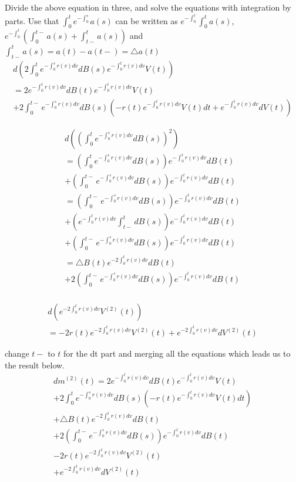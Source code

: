 \documentclass[12pt]{article}
\begin{document}
Divide the above equation in three, and solve the equations with integration by parts. Use that $\int_0^t e^{-\int_0^s} a(s)$ can be written as $e^{-\int_0^t} \int_0^t a(s)$, $e^{-\int_0^t} (\int_0^{t-} a(s) + \int_{t-}^t a(s))$ and $\int_{t-}^t a(s) = a(t) - a(t-) = \triangle a(t)$
\begin{equation}
\begin{split}
d(2 \int_0^t {e^{-\int_0^s {r(v) dv}}dB(s) e^{-\int_0^t {r(v) dv}}} V(t)) \\
= 2e^{-\int_0^t {r(v) dv}}dB(t)e^{-\int_0^t {r(v) dv}}V(t) \\
+ 2 \int_0^{t-} e^{-\int_0^s r(v)dv} dB(s)(-r(t)e^{-\int_0^t r(v) dv}V(t)dt + e^{-\int_0^t r(v) dv} dV(t)) 
\end{split}
\end{equation}

\begin{equation}
\begin{split}
d((\int_0^t {e^{-\int_0^s {r(v) dv}}dB(s)})^2) \\
= (\int_0^t {e^{-\int_0^s {r(v) dv}}dB(s)})e^{-\int_0^t {r(v) dv}}dB(t) \\
+ (\int_0^{t-} {e^{-\int_0^s {r(v) dv}}dB(s)})e^{-\int_0^t {r(v) dv}}dB(t) \\
= (\int_0^{t-} {e^{-\int_0^s {r(v) dv}}dB(s)})e^{-\int_0^t {r(v) dv}}dB(t) \\
+ (e^{-\int_0^t {r(v) dv}}\int_{t-}^{t} {dB(s)})e^{-\int_0^t {r(v) dv}}dB(t) \\
+ (\int_0^{t-} {e^{-\int_0^s {r(v) dv}}dB(s)})e^{-\int_0^t {r(v) dv}}dB(t) \\
= \triangle B(t) e^{-2\int_0^t {r(v) dv}}dB(t) \\
+ 2(\int_0^{t-} {e^{-\int_0^s {r(v) dv}}dB(s)})e^{-\int_0^t {r(v) dv}}dB(t) \\
\end{split}
\end{equation}

\begin{equation}
\begin{split}
d(e^{-2\int_0^t {r(v) dv}} V^{(2)}(t)) \\
= -2r(t)e^{-2\int_0^t {r(v) dv}} V^{(2)}(t) + e^{-2\int_0^t {r(v) dv}} dV^{(2)}(t)
\end{split}
\end{equation}

change $t-$ to $t$ for the dt part and merging all the equations which leads us to the result below.
\begin{equation}
\begin{split}
dm^{(2)}(t) = 2e^{-\int_0^t {r(v) dv}}dB(t)e^{-\int_0^t {r(v) dv}}V(t) \\
+ 2 \int_0^{t} e^{-\int_0^s r(v)dv} dB(s)(-r(t)e^{-\int_0^t r(v) dv}V(t) dt) \\
+ \triangle B(t) e^{-2\int_0^t {r(v) dv}}dB(t) \\
+ 2(\int_0^{t-} {e^{-\int_0^s {r(v) dv}}dB(s)})e^{-\int_0^t {r(v) dv}}dB(t) \\
-2r(t)e^{-2\int_0^t {r(v) dv}} V^{(2)}(t) \\
+ e^{-2\int_0^t {r(v) dv}} dV^{(2)}(t)
\end{split}
\end{equation}
\end{document}

